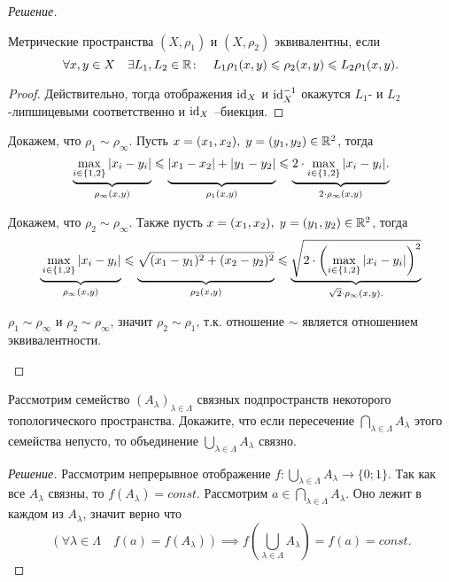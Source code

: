 \documentclass[10pt]{article}
\begin{document}
\begin{tasks}
\begin{proof}[Решение]
        \begin{minipage}[b]{0.9\linewidth}
            \begin{lemma}
                Метрические пространства $(X, \rho_1)$ и $(X, \rho_2)$ эквивалентны, если \[\forall x,y \in X\quad\exists L_1, L_2 \in \mathbb R\colon \quad L_1 \rho_1(x,y) \leqslant \rho_2(x,y) \leqslant L_2\rho_1(x, y).\]
            \end{lemma}
            \begin{proof}
                Действительно, тогда отображения $\operatorname{id}_X$ и $\operatorname{id}_X^{-1}$ окажутся $L_1$- и $L_2$-липшицевыми соответственно и $\operatorname{id}_X$ --биекция.
            \end{proof}
        \end{minipage}
        
        \begin{conditions}
            \item Докажем, что $\rho_1 \sim \rho_\infty$. Пусть $x=(x_1,x_2),\; y=(y_1, y_2) \in \mathbb R^2$, тогда \[\underbrace{\max_{i\in\{1, 2\}}|x_i-y_i|}_{\rho_\infty(x,y)}\leqslant\underbrace{\vphantom{\max_{t\in\{x, y\}}}|x_1-x_2| + |y_1-y_2|}_{\rho_1(x,y)}\leqslant\underbrace{2\cdot\max_{i\in\{1, 2\}}|x_i-y_i|.}_{2\cdot\rho_\infty(x,y)}\]
            \item Докажем, что $\rho_2 \sim \rho_{\infty}$. Также пусть $x =(x_1,x_2),\;y=(y_1, y_2) \in \mathbb R^2$, тогда \[
                \underbrace{\vphantom{\sqrt{2\cdot\left(\max_{i\in\{1, 2\}}|x_i-y_i|\right)^2}}\max_{i\in\{1, 2\}}|x_i-y_i|}_{\rho_\infty(x,y)}\leqslant\underbrace{\vphantom{\sqrt{2\cdot\left(\max_{i\in\{1, 2\}}|x_i-y_i|\right)^2}}\sqrt{(x_1-y_1)^2+(x_2-y_2)^2}}_{\rho_2(x,y)}\leqslant \underbrace{\sqrt{2\cdot\left(\max_{i\in\{1, 2\}}|x_i-y_i|\right)^2}}_{\sqrt2 \cdot \rho_\infty(x,y).}
            \]
            \item $\rho_1 \sim \rho_{\infty}$ и $\rho_2 \sim \rho_\infty$, значит $\rho_2 \sim \rho_1$, т.к. отношение $\sim$ является отношением эквивалентности. 
        \end{conditions}
    \end{proof}
    \item Рассмотрим семейство $(A_\lambda)_{\lambda\in\Lambda}$ связных подпространств некоторого топологического пространства. Докажите, что если пересечение $\bigcap_{\lambda\in\Lambda} A_\lambda$ этого семейства непусто, то объединение  $\bigcup_{\lambda\in\Lambda}A_\lambda$ связно.

    \begin{proof}[Решение]
        Рассмотрим непрерывное отображение $f\colon \bigcup_{\lambda\in\Lambda}A_\lambda\to \{0;1\}.$ Так как все $A_\lambda$ связны, то $f({A_\lambda}) = const.$ Рассмотрим $a \in \bigcap_{\lambda\in\Lambda}A_\lambda$. Оно лежит в каждом из $A_\lambda$, значит верно что \[(\forall \lambda \in \Lambda \quad f(a) = f(A_\lambda)) \implies f\left(\bigcup_{\lambda \in \Lambda} A_\lambda\right) = f(a) = const.\]


\end{proof}
\end{tasks}
\end{document}
